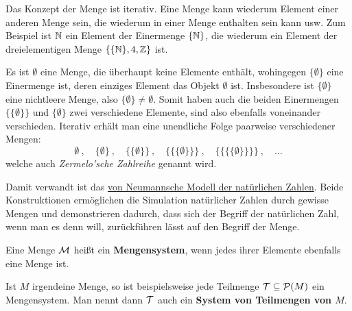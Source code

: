 \begin{vorschau} \label{mengeniterativ}
    Das Konzept der Menge ist iterativ. Eine Menge kann wiederum Element einer anderen Menge sein, die wiederum in einer Menge enthalten sein kann usw. Zum Beispiel ist $\mathbb N$ ein Element der Einermenge $\{\mathbb N\}$, die wiederum ein Element der dreielementigen Menge $\{ \{\mathbb N \}, 4, \mathbb Z\}$ ist.

    Es ist $\emptyset$ eine Menge, die überhaupt keine Elemente enthält, wohingegen $\{\emptyset\}$ eine Einermenge ist, deren einziges Element das Objekt $\emptyset$ ist. Insbesondere ist $\{\emptyset\}$ eine nichtleere Menge, also $\{\emptyset\}\neq \emptyset$. Somit haben auch die beiden Einermengen $\{\{\emptyset\}\}$ und $\{\emptyset\}$ zwei verschiedene Elemente, sind also ebenfalls voneinander verschieden. Iterativ erhält man eine unendliche Folge paarweise verschiedener Mengen:
        \[ \emptyset \ ,\quad \{\emptyset\} \ ,\quad \{\{\emptyset\}\} \ ,\quad \{\{\{\emptyset\}\}\} \ , \quad \{\{\{\{\emptyset\}\}\}\} \ ,\quad \dots \]
    welche auch \emph{Zermelo'sche Zahlreihe} genannt wird.

    Damit verwandt ist das \href{https://de.wikipedia.org/wiki/Nat\%C3\%BCrliche_Zahl#Von_Neumanns_Modell_der_nat\%C3\%BCrlichen_Zahlen}{von Neumannsche Modell der natürlichen Zahlen}. Beide Konstruktionen ermöglichen die Simulation natürlicher Zahlen durch gewisse Mengen und demonstrieren dadurch, dass sich der Begriff der natürlichen Zahl, wenn man es denn will, zurückführen lässt auf den Begriff der Menge.
\end{vorschau}


\begin{defin}[Mengensystem]  
    Eine Menge $\mathcal M$ heißt ein \textbf{Mengensystem}, wenn jedes ihrer Elemente ebenfalls eine Menge ist.

    Ist $M$ irgendeine Menge, so ist beispielsweise jede Teilmenge $\mathcal T\subseteq \mathcal P(M)$ ein Mengensystem. Man nennt dann $\mathcal T$ auch ein \textbf{System von Teilmengen von $M$}.
\end{defin}


